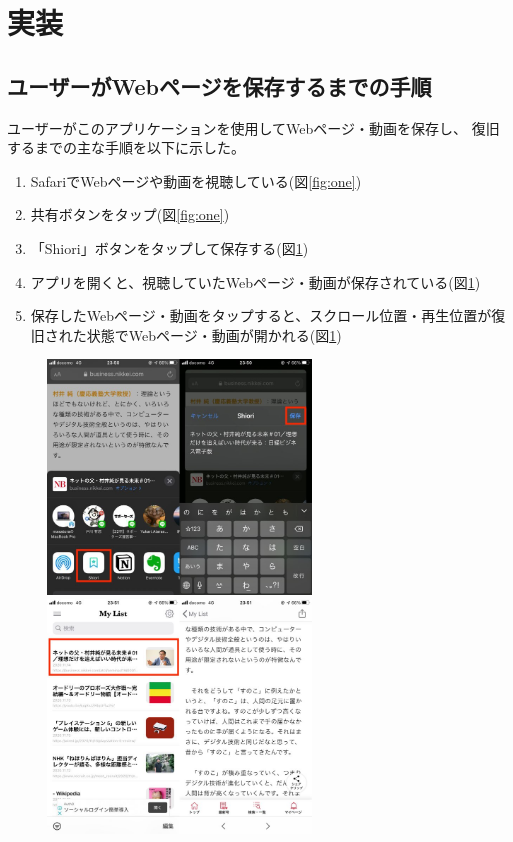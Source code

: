 \documentclass[a4j,10pt]{jsarticle}
\begin{document}
\section{実装}
\subsection{ユーザーがWebページを保存するまでの手順}
ユーザーがこのアプリケーションを使用してWebページ・動画を保存し、
復旧するまでの主な手順を以下に示した。
\begin{enumerate}
\item SafariでWebページや動画を視聴している(図\ref{fig:one})
\item 共有ボタンをタップ(図\ref{fig:one})
\item 「Shiori」ボタンをタップして保存する(図\ref{fig:two})
\item アプリを開くと、視聴していたWebページ・動画が保存されている(図\ref{fig:two})
\item 保存したWebページ・動画をタップすると、スクロール位置・再生位置が復旧された状態でWebページ・動画が開かれる(図\ref{fig:two})
\end{enumerate}

\begin{figure}[htbp]
    \begin{minipage}{0.5\hsize}
        \begin{center}
        \includegraphics[width=70mm]{../assets/scroll_position/scroll_position1.png}
        \end{center}
        \caption{}
        \label{fig:one}
    \end{minipage}
    \begin{minipage}{0.5\hsize}
        \begin{center}
        \includegraphics[width=70mm]{../assets/scroll_position/scroll_position2.png}
        \end{center}
        \caption{}
        \label{fig:two}
    \end{minipage}
\end{figure}
\end{document}
